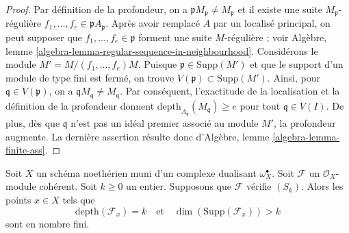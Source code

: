 \begin{proof}
Par définition de la profondeur, on a $\mathfrak p M_\mathfrak p \not = M_\mathfrak p$ et il existe une suite $M_\mathfrak p$-régulière $f_1, \ldots, f_e \in \mathfrak p A_\mathfrak p$. Après avoir remplacé $A$ par un localisé principal, on peut supposer que $f_1, \ldots, f_e \in \mathfrak p$ forment une suite $M$-régulière ; voir Algèbre, lemme \ref{algebra-lemma-regular-sequence-in-neighbourhood}. Considérons le module $M' = M/(f_1, \ldots, f_e)M$. Puisque $\mathfrak p \in \text{Supp}(M')$ et que le support d'un module de type fini est fermé, on trouve $V(\mathfrak p) \subset \text{Supp}(M')$. Ainsi, pour $\mathfrak q \in V(\mathfrak p)$, on a $\mathfrak q M_\mathfrak q \not = M_\mathfrak q$. Par conséquent, l'exactitude de la localisation et la définition de la profondeur donnent $\text{depth}_{A_\mathfrak q}(M_\mathfrak q) \geq e$ pour tout $\mathfrak q \in V(I)$. De plus, dès que $\mathfrak q$ n'est pas un idéal premier associé au module $M'$, la profondeur augmente. La dernière assertion résulte donc d'Algèbre, lemme \ref{algebra-lemma-finite-ass}.
\end{proof}

\begin{lemma}
\label{lemma-finite-nr-points-next-S}
Soit $X$ un schéma noethérien muni d'un complexe dualisant $\omega_X^\bullet$. Soit $\mathcal{F}$ un $\mathcal{O}_X$-module cohérent. Soit $k \geq 0$ un entier. Supposons que $\mathcal{F}$ vérifie $(S_k)$. Alors les points $x \in X$ tels que
$$
\text{depth}(\mathcal{F}_x) = k
\quad\text{et}\quad
\dim(\text{Supp}(\mathcal{F}_x)) > k
$$
sont en nombre fini.
\end{lemma}

